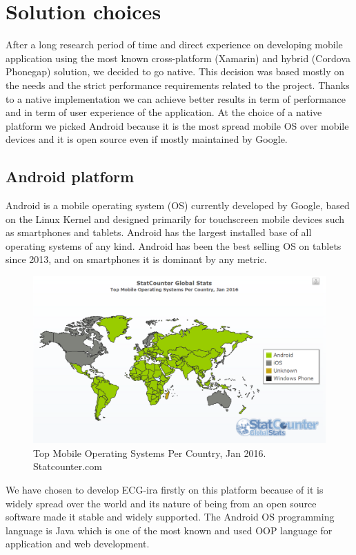 
\chapter{Solution choices}
\label{Chapter7}

After a long research period of time and direct experience on developing mobile application using the most known cross-platform (Xamarin) and hybrid (Cordova Phonegap) solution, we decided to go native. This decision was based mostly on the needs and the strict performance requirements related to the project. Thanks to a native implementation we can achieve better results in term of performance and in term of user experience of the application. At the choice of a native platform we picked  Android because it is the most spread mobile OS over mobile devices and it is open source even if mostly maintained by Google.

\section{Android platform}
Android is a mobile operating system (OS) currently developed by Google, based on the Linux Kernel and designed primarily for touchscreen mobile devices such as smartphones and tablets. Android has the largest installed base of all operating systems of any kind. Android has been the best selling OS on tablets since 2013, and on smartphones it is dominant by any metric.\cite{ref18}
\begin{figure}[ht!]
	\centering
	\includegraphics[width=120mm]{figures/ch7/1.png}
	\caption{Top Mobile Operating Systems Per Country, Jan 2016. Statcounter.com}
	\label{fig7.1}
\end{figure}
We have chosen to develop ECG-ira firstly on this platform because of it is widely spread over the world and its nature of being from an open source software made it stable and widely supported. The Android OS programming language is Java which is one of the most known and used OOP language for application and web development.

